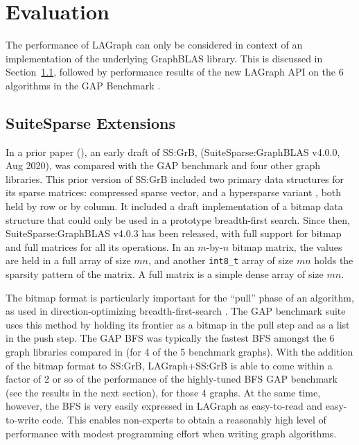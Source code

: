 \section{Evaluation}
\label{sec:evaluation}

The performance of LAGraph can only be considered in context of an
implementation of the underlying GraphBLAS library.  This is discussed in
Section~\ref{sec:extensions}, followed by performance results of the new
LAGraph API on the 6 algorithms in the GAP Benchmark
\cite{DBLP:conf/sc/BeamerAP12}.

\subsection{SuiteSparse Extensions}
\label{sec:extensions}

In a prior paper (\cite{DBLP:conf/iiswc/AzadABBCDDDDFGG20}), an early draft of
SS:GrB, (SuiteSparse:GraphBLAS v4.0.0, Aug 2020), was compared with the GAP benchmark
\cite{DBLP:conf/sc/BeamerAP12} and four other graph libraries.  This prior
version of SS:GrB included two primary data structures for its sparse matrices:
compressed sparse vector, and a hypersparse variant
\cite{DBLP:conf/ipps/BulucG08}, both held by row or by column.  It included a
draft implementation of a bitmap data structure that could only be used in a
prototype breadth-first search.  Since then, SuiteSparse:GraphBLAS v4.0.3 has
been released, with full support for bitmap and full matrices for all its
operations.  In an $m$-by-$n$ bitmap matrix, the values are held in a full
array of size $mn$, and another \verb'int8_t' array of size $mn$ holds the
sparsity pattern of the matrix.  A full matrix is a simple dense array of size
$mn$.

The bitmap format is particularly important for the ``pull'' phase of an
algorithm, as used in direction-optimizing breadth-first-search
\cite{DBLP:conf/sc/BeamerAP12,DBLP:conf/icpp/YangBO18}.  The GAP benchmark suite uses this method by
holding its frontier as a bitmap in the pull step and as a list in the push
step. The GAP BFS was typically the fastest BFS amongst the 6 graph
libraries compared in \cite{DBLP:conf/iiswc/AzadABBCDDDDFGG20} (for 4 of the 5
benchmark graphs).  With the addition of the bitmap format to SS:GrB,
LAGraph+SS:GrB is able to come within a factor of 2 or so of the performance of
the highly-tuned BFS GAP benchmark (see the results in the next section), for
those 4 graphs.  At the same time, however, the BFS is very easily expressed in
LAGraph as easy-to-read and easy-to-write code.  This enables non-experts to
obtain a reasonably high level of performance with modest programming effort
when writing graph algorithms.

